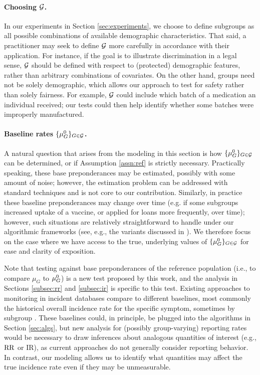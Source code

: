 \paragraph{Choosing ${\mathcal{G}}$.}
In our experiments in Section \ref{sec:experiments}, we choose to define subgroups as all possible combinations of available demographic characteristics.
That said, a practitioner may seek to define ${\mathcal{G}}$ more carefully in accordance with their application. For instance, if the goal is to illustrate discrimination in a legal sense, ${\mathcal{G}}$ should be defined with respect to (protected) demographic features, rather than arbitrary combinations of covariates. On the other hand, groups need not be solely demographic, which allows our approach to test for safety rather than solely fairness. For example, ${\mathcal{G}}$ could include which batch of a medication an individual received; our tests could then help identify whether some batches were improperly manufactured.  

\paragraph{Baseline rates $\{{\mu_G^0}\}_{G \in {\mathcal{G}}}$.} A natural question that arises from the modeling in this section is how $\{{\mu_G^0}\}_{G \in {\mathcal{G}}}$ can be determined, or if Assumption \ref{assn:ref} is strictly necessary. 
Practically speaking, these base preponderances may be estimated, possibly with some amount of noise; however, the estimation problem can be addressed with standard techniques and is not core to our contribution. 
Similarly, in practice these baseline preponderances may change over time (e.g. if some subgroups increased uptake of a vaccine, or applied for loans more frequently, over time); however, such situations are relatively straightforward to handle under our algorithmic frameworks (see, e.g., the variants discussed in \citet{chugg2024auditing}). 
We therefore focus on the case where we have access to the true, underlying values of $\{{\mu_G^0}\}_{G \in {\mathcal{G}}}$ for ease and clarity of exposition. 

Note that testing against base preponderances of the reference population (i.e., to compare $\mu_G$ to ${\mu_G^0}$) is a new test proposed by this work, and the analysis in Sections \ref{subsec:rr} and \ref{subsec:ir} is specific to this test. Existing approaches to monitoring in incident databases compare to different baselines, most commonly the historical overall incidence rate for the specific symptom, sometimes by subgroup
\citep{shimabukuro2015safety, kulldorff2011maximized, oster2022myocarditis}. 
These baselines could, in principle, be plugged into the algorithms in Section \ref{sec:algs}, but new analysis for (possibly group-varying) reporting rates would be necessary to draw inferences about analogous quantities of interest (e.g., $\mathrm{RR}$ or $\mathrm{IR}$), as current approaches do not generally consider reporting behavior.
In contrast, our modeling allows us to identify what quantities may affect the true incidence rate even if they may be unmeasurable.


